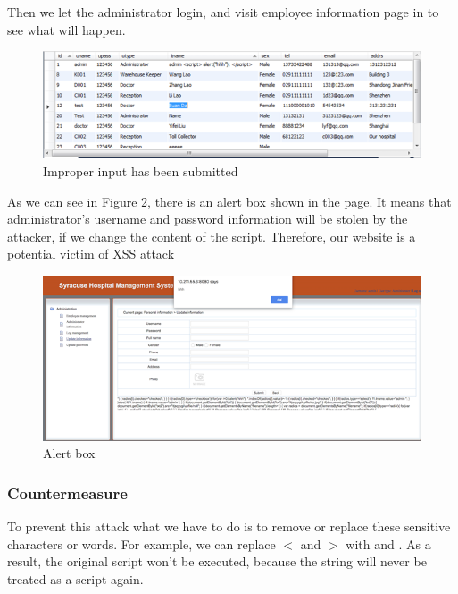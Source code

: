 Then we let the administrator login, and visit employee information page in to see what will happen.
\begin{figure}[H]
    \centering
    \includegraphics[width=\textwidth]{sp/sp12.png}
    \caption{Improper input has been submitted}
    \label{fig:s12}
\end{figure} 
As we can see in Figure \ref{fig:s13}, there is an alert box shown in the page. It means that administrator’s username and password information will be stolen by the attacker, if we change the content of the script. Therefore, our website is a potential victim of XSS attack
\begin{figure}[H]
    \centering
    \includegraphics[width=\textwidth]{sp/sp13.png}
    \caption{Alert box}
    \label{fig:s13}
\end{figure} 

\subsubsection{Countermeasure}
To prevent this attack what we have to do is to remove or replace these sensitive characters or words. For example, we can replace $<$ and $>$ with \lbrack{} and \rbrack{} . As a result, the original script won’t be executed, because the string will never be treated as a script again.
 
